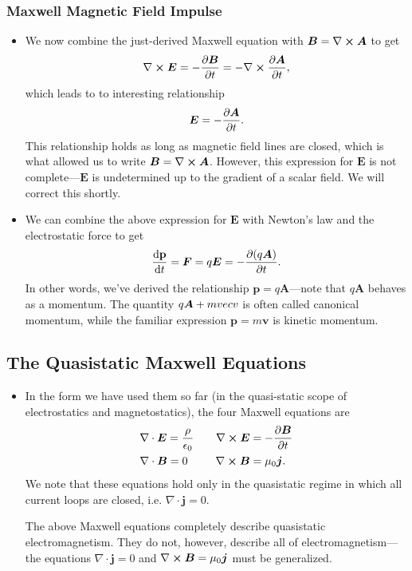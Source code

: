 \documentclass[11pt, a4paper]{article}
\renewcommand{\vec}[1]{\bm{#1}} %
\newcommand{\mat}[1]{\mathbf{#1}} %
\newcommand{\E}{\vec{E}} %
\newcommand{\B}{\vec{B}} %
\newcommand{\A}{\vec{A}} %
\newcommand{\ee}{\epsilon_{0}}  %
\newcommand{\mm}{\mu_{0}}  %
\renewcommand{\j}{\vec{j}}  %
\renewcommand{\div}{\nabla \cdot}
\renewcommand{\curl}{\nabla \cross}
\begin{document}
\subsubsection{Maxwell Magnetic Field Impulse}
\begin{itemize}
	\item We now combine the just-derived Maxwell equation with $ \B = \curl \A $ to get
	\begin{equation*}
		\curl \E = - \pdv{\B}{t} = - \curl \pdv{\A}{t},
	\end{equation*}
	which leads to to interesting relationship
	\begin{equation*}
		\E = - \pdv{\A}{t}.
	\end{equation*}
	This relationship holds as long as magnetic field lines are closed, which is what allowed us to write $ \B = \curl \A $. However, this expression for $ \E $ is not complete---$ \E $ is undetermined up to the gradient of a scalar field. We will correct this shortly.
	
	\item We can combine the above expression for $ \E $ with Newton's law and the electrostatic force to get
	\begin{equation*}
		\dv{\mat{p}}{t} = \vec{F} = q \E = - \pdv{(q \A)}{t}.
	\end{equation*} 
    In other words, we've derived the relationship $ \vec{p} = q \A $---note that $ q\A $ behaves as a momentum. The quantity $ q \A + m \\vec{v} $ is often called canonical momentum, while the familiar expression $ \vec{p} = m \vec{v} $ is kinetic momentum.
	
\end{itemize}

\subsection{The Quasistatic Maxwell Equations}
\begin{itemize}
	\item In the form we have used them so far (in the quasi-static scope of electrostatics and magnetostatics), the four Maxwell equations are
	\begin{align*}
		&\div \E = \frac{\rho}{\ee} \qquad \curl \E = - \pdv{\B}{t}\\
		& \div \B = 0 \ \, \qquad \curl \B = \mm \j.
	\end{align*}
	We note that these equations hold only in the quasistatic regime in which all current loops are closed, i.e. $ \div \j = 0 $. 
	
	The above Maxwell equations completely describe quasistatic electromagnetism. They do not, however, describe all of electromagnetism---the equations $ \div \j = 0 $ and $ \curl \B = \mm \j  $ must be generalized.
\end{itemize}
\end{document}
